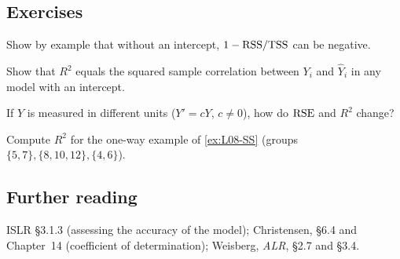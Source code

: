 \subsection{Exercises}
\begin{problem}\label{prob:L17-1}
Show by example that without an intercept, $1-\mathrm{RSS}/\mathrm{TSS}$ can be negative.
\end{problem}
\begin{problem}\label{prob:L17-2}
Show that $R^2$ equals the squared sample correlation between $Y_i$ and $\hat Y_i$ in any model with an intercept.
\end{problem}
\begin{problem}\label{prob:L17-3}
If $Y$ is measured in different units ($Y'=cY$, $c\ne0$), how do $\mathrm{RSE}$ and $R^2$ change?
\end{problem}
\begin{problem}\label{prob:L17-4}
Compute $R^2$ for the one-way example of \cref{ex:L08-SS} (groups $\{5,7\},\{8,10,12\},\{4,6\}$).
\end{problem}

\subsection{Further reading}
ISLR \S3.1.3 (assessing the accuracy of the model); Christensen, \S6.4 and Chapter~14 (coefficient of
determination); Weisberg, \emph{ALR}, \S2.7 and \S3.4.

